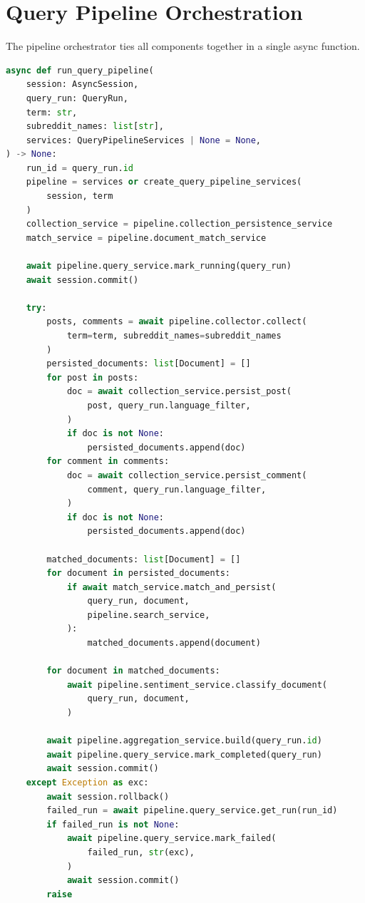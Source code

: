 \section{Query Pipeline Orchestration}
\label{sec:pipeline_impl}

The pipeline orchestrator ties all components together in a single async function.

\begin{lstlisting}[language=Python, caption={Main query pipeline function (simplified)}]
async def run_query_pipeline(
    session: AsyncSession,
    query_run: QueryRun,
    term: str,
    subreddit_names: list[str],
    services: QueryPipelineServices | None = None,
) -> None:
    run_id = query_run.id
    pipeline = services or create_query_pipeline_services(
        session, term
    )
    collection_service = pipeline.collection_persistence_service
    match_service = pipeline.document_match_service

    await pipeline.query_service.mark_running(query_run)
    await session.commit()

    try:
        posts, comments = await pipeline.collector.collect(
            term=term, subreddit_names=subreddit_names
        )
        persisted_documents: list[Document] = []
        for post in posts:
            doc = await collection_service.persist_post(
                post, query_run.language_filter,
            )
            if doc is not None:
                persisted_documents.append(doc)
        for comment in comments:
            doc = await collection_service.persist_comment(
                comment, query_run.language_filter,
            )
            if doc is not None:
                persisted_documents.append(doc)

        matched_documents: list[Document] = []
        for document in persisted_documents:
            if await match_service.match_and_persist(
                query_run, document,
                pipeline.search_service,
            ):
                matched_documents.append(document)

        for document in matched_documents:
            await pipeline.sentiment_service.classify_document(
                query_run, document,
            )

        await pipeline.aggregation_service.build(query_run.id)
        await pipeline.query_service.mark_completed(query_run)
        await session.commit()
    except Exception as exc:
        await session.rollback()
        failed_run = await pipeline.query_service.get_run(run_id)
        if failed_run is not None:
            await pipeline.query_service.mark_failed(
                failed_run, str(exc),
            )
            await session.commit()
        raise
\end{lstlisting}

